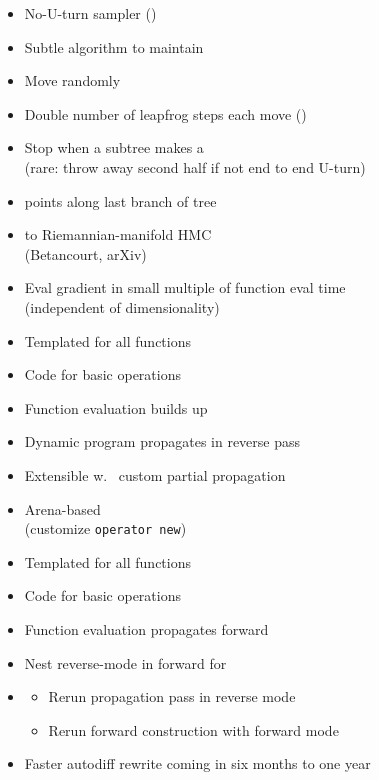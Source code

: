 \documentclass[10pt]{report}
\newcommand{\sld}[1]{\newpage{\noindent\LARGE \ \ \
    \textcolor{MidnightBlue}{\bfseries #1}}\vspace*{4pt}}
\newcommand{\code}[1]{{\tt #1}}
\newcommand{\myemph}[1]{{\color{MidnightBlue}{\bfseries #1}}}
\begin{document}
\sld{Adapting HMC During Sampling}

\begin{itemize}
\item No-U-turn sampler (\myemph{NUTS})
\item Subtle algorithm to maintain \myemph{detailed balance}
\item Move randomly \myemph{forward or backward in time}
\item Double number of leapfrog steps each move (\myemph{binary tree})
\item Stop when a subtree makes a \myemph{U-turn}
\\ {\footnotesize (rare: throw away second half if not end to end U-turn)}
\item \myemph{Slice sample} points along last branch of tree
\item \myemph{Generalized} to Riemannian-manifold HMC
\\ {\footnotesize (Betancourt, arXiv)}
\end{itemize}

\sld{Reverse-Mode Auto Diff}
\begin{itemize}
\item Eval gradient in small multiple of function eval time
\\
{\footnotesize (independent of dimensionality)}
\item Templated \myemph{C++ overload} for all functions
\item Code \myemph{partial derivatives} for basic operations
\item Function evaluation builds up \myemph{expression tree}
\item Dynamic program propagates \myemph{chain rule} in reverse pass
\item Extensible w.\ \myemph{object-oriented} custom partial propagation
\item Arena-based \myemph{memory management}
\\ {\footnotesize (customize \code{operator new})}
\end{itemize}

\sld{Forward-Mode Auto Diff}
\begin{itemize}
\item Templated \myemph{C++ overload} for all functions
\item Code \myemph{partial derivatives} for basic operations
\item Function evaluation propagates \myemph{chain rule} forward
\item Nest reverse-mode in forward for \myemph{higher-order}
\item \myemph{Jacobians}
\vspace*{-4pt}
\begin{itemize}\small
\item Rerun propagation pass in reverse mode
\item Rerun forward construction with forward mode
\end{itemize}
\vfill
\item Faster autodiff rewrite coming in six months to one year
\end{itemize}
\end{document}
